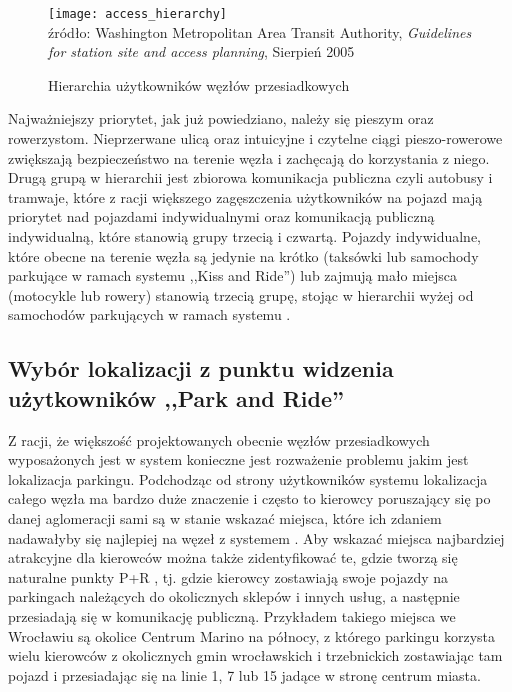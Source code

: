 \documentclass[twoside,12pt]{article}
\begin{document}
	\begin{figure}[H]
		\centering
		\caption{Hierarchia użytkowników węzłów przesiadkowych}
		\texttt{[image: access\_hierarchy]}\\
		\footnotesize{źródło: Washington Metropolitan Area Transit Authority, \emph{Guidelines for station site and access planning}, Sierpień 2005 \cite{guidelines_washington}}
		\label{access-hierarchy}
	\end{figure}
	
	Najważniejszy priorytet, jak już powiedziano, należy się pieszym oraz rowerzystom. Nieprzerwane ulicą oraz intuicyjne i czytelne ciągi pieszo-rowerowe zwiększają bezpieczeństwo na terenie węzła i zachęcają do korzystania z niego. Drugą grupą w hierarchii jest zbiorowa komunikacja publiczna czyli autobusy i tramwaje, które z racji większego zagęszczenia użytkowników na pojazd mają priorytet nad pojazdami indywidualnymi oraz komunikacją publiczną indywidualną, które stanowią grupy trzecią i czwartą. Pojazdy indywidualne, które obecne na terenie węzła są jedynie na krótko (taksówki lub samochody parkujące w ramach systemu ,,Kiss and Ride'') lub zajmują mało miejsca (motocykle lub rowery) stanowią trzecią grupę, stojąc w hierarchii wyżej od samochodów parkujących w ramach systemu \pnr{} \cite{guidelines_washington}.
	
	\subsection{Wybór lokalizacji z punktu widzenia użytkowników ,,Park and Ride''}
	
	Z racji, że większość projektowanych obecnie węzłów przesiadkowych wyposażonych jest w system \pnr{} konieczne jest rozważenie problemu jakim jest lokalizacja parkingu. Podchodząc od strony użytkowników systemu \pnr{} lokalizacja całego węzła ma bardzo duże znaczenie i często to kierowcy poruszający się po danej aglomeracji sami są w stanie wskazać miejsca, które ich zdaniem nadawałyby się najlepiej na węzeł z systemem \pnr{}. Aby wskazać miejsca najbardziej atrakcyjne dla kierowców można także zidentyfikować te, gdzie tworzą się naturalne punkty P+R \cite{guide}, tj. gdzie kierowcy zostawiają swoje pojazdy na parkingach należących do okolicznych sklepów i innych usług, a następnie przesiadają się w komunikację publiczną. Przykładem takiego miejsca we Wrocławiu są okolice Centrum Marino na północy, z którego parkingu korzysta wielu kierowców z okolicznych gmin wrocławskich i trzebnickich zostawiając tam pojazd i przesiadając się na linie 1, 7 lub 15 jadące w stronę centrum miasta. 
	
\end{document}
